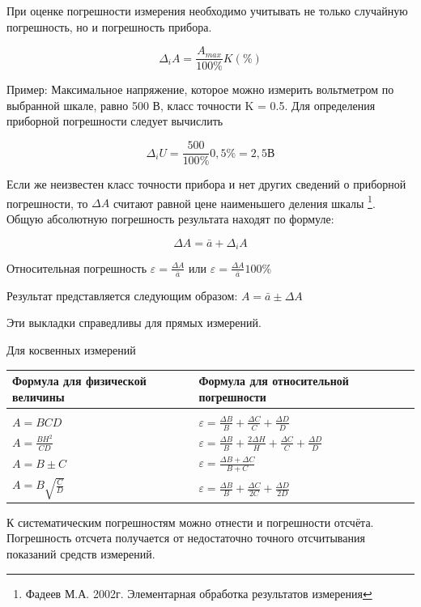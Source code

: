 \documentclass[a6paper, 11pt]{diss_4}
\renewcommand{\'}{\,'}
\begin{document}
 При оценке погрешности измерения необходимо учитывать не только случайную
погрешность, но и погрешность прибора.

\[\Delta_i A=\frac{A_{max}}{100\%}K(\%)\]

 Пример: Максимальное напряжение, которое можно измерить вольтметром по
выбранной шкале, равно 500 В, класс точности K = 0.5. Для определения
приборной погрешности следует вычислить

\[\Delta_i U=\frac{500}{100\%}0,5\%=2,5 В\]

  Если же неизвестен класс точности прибора и нет других сведений о приборной
погрешности, то $\Delta A$ считают равной цене наименьшего деления шкалы
\footnote{Фадеев М.А. 2002г. Элементарная обработка результатов измерения}.
Общую абсолютную погрешность результата находят по формуле:

\[\Delta A=\bar{a}+\Delta_i A\]

  Относительная погрешность $\varepsilon=\frac{\Delta A}{\bar{a}}$ или
$\varepsilon=\frac{\Delta A}{\bar{a}}100\%$

  Результат представляется следующим образом:
  $A=\bar{a}\pm\Delta A$

  Эти выкладки справедливы для прямых измерений.

  Для косвенных измерений

\begin{center}

\begin{tabular}[c]{l|l}
\toprule
Формула для физической величины & Формула для относительной погрешности\\  %
\midrule\\
$A=BCD$&$\varepsilon=\frac{\Delta B}{B}+\frac{\Delta C}{C}+\frac{\Delta D}{D}$\\ [5pt] %
$A=\frac{BH^2}{CD}$&$\varepsilon=\frac{\Delta B}{B}+\frac{2\Delta H}{H}+\frac{\Delta C}{C}+\frac{\Delta D}{D}$\\ [5pt] %
$A=B\pm C$&$\varepsilon=\frac{\Delta B+\Delta C}{B+C}$\\ [5pt] %
$A=B\sqrt{\frac{C}{D}}$&$\varepsilon=\frac{\Delta B}{B}+\frac{\Delta C}{2C}+\frac{\Delta D}{2D}$\\ [5pt]
\bottomrule
\end{tabular}
\end{center}


 К систематическим погрешностям можно отнести и погрешности отсчёта.
Погрешность отсчета получается от недостаточно точного отсчитывания показаний
средств измерений.
\end{document}
